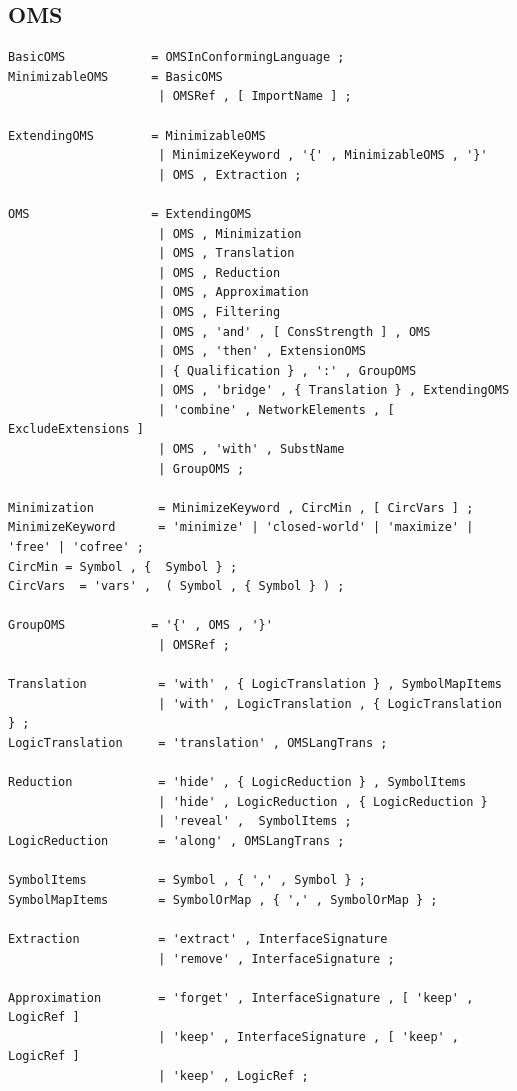 \documentclass[10pt,fleqn,%
\ifpretendfinal
final%
\else
draft%
\fi,
]{scrreprt}
\newcommand{\ssclause}[1]{\subsection{#1}}
\begin{document}
\vspace{1em}

\ssclause{OMS}\label{a:dol-text:OMS}

\begin{lstlisting}[language=ebnf,escapeinside={<>},mathescape]
BasicOMS            = OMSInConformingLanguage ;
MinimizableOMS      = BasicOMS
                     | OMSRef , [ ImportName ] ; 
                     
ExtendingOMS        = MinimizableOMS
                     | MinimizeKeyword , '{' , MinimizableOMS , '}' 
                     | OMS , Extraction ;
                     
OMS                 = ExtendingOMS
                     | OMS , Minimization 
                     | OMS , Translation
                     | OMS , Reduction
                     | OMS , Approximation
                     | OMS , Filtering
                     | OMS , 'and' , [ ConsStrength ] , OMS 
                     | OMS , 'then' , ExtensionOMS
                     | { Qualification } , ':' , GroupOMS
                     | OMS , 'bridge' , { Translation } , ExtendingOMS 
                     | 'combine' , NetworkElements , [ ExcludeExtensions ]  
                     | OMS , 'with' , SubstName
                     | GroupOMS ;

Minimization         = MinimizeKeyword , CircMin , [ CircVars ] ;
MinimizeKeyword      = 'minimize' | 'closed-world' | 'maximize' | 'free' | 'cofree' ;
CircMin = Symbol , {  Symbol } ;
CircVars  = 'vars' ,  ( Symbol , { Symbol } ) ;

GroupOMS            = '{' , OMS , '}'
                     | OMSRef ;

Translation          = 'with' , { LogicTranslation } , SymbolMapItems
                     | 'with' , LogicTranslation , { LogicTranslation } ;
LogicTranslation     = 'translation' , OMSLangTrans ;
                      
Reduction            = 'hide' , { LogicReduction } , SymbolItems 
                     | 'hide' , LogicReduction , { LogicReduction } 
                     | 'reveal' ,  SymbolItems ;
LogicReduction       = 'along' , OMSLangTrans ;

SymbolItems          = Symbol , { ',' , Symbol } ;
SymbolMapItems       = SymbolOrMap , { ',' , SymbolOrMap } ;

Extraction           = 'extract' , InterfaceSignature
                     | 'remove' , InterfaceSignature ;

Approximation        = 'forget' , InterfaceSignature , [ 'keep' , LogicRef ] 
                     | 'keep' , InterfaceSignature , [ 'keep' , LogicRef ] 
                     | 'keep' , LogicRef ;


\end{lstlisting}
\end{document}
